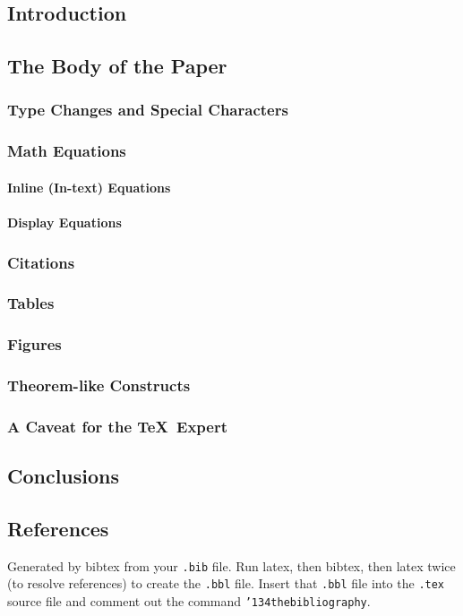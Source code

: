 \subsection{Introduction}
\subsection{The Body of the Paper}
\subsubsection{Type Changes and  Special Characters}
\subsubsection{Math Equations}
\paragraph{Inline (In-text) Equations}
\paragraph{Display Equations}
\subsubsection{Citations}
\subsubsection{Tables}
\subsubsection{Figures}
\subsubsection{Theorem-like Constructs}
\subsubsection*{A Caveat for the \TeX\ Expert}
\subsection{Conclusions}
\subsection{References}
Generated by bibtex from your \texttt{.bib} file.  Run latex,
then bibtex, then latex twice (to resolve references)
to create the \texttt{.bbl} file.  Insert that \texttt{.bbl}
file into the \texttt{.tex} source file and comment out
the command \texttt{{\char'134}thebibliography}.
